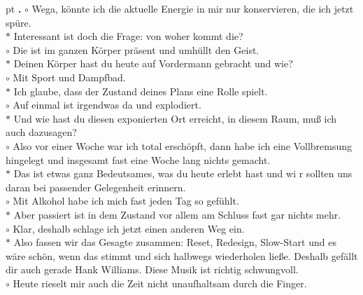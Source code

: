\documentclass[10pt,a4paper]{article}
\newcounter{notec}
\newcommand\notep[1]{%
  \stepcounter{notec}
  \vskip #1pt
  {\bf\arabic{notec}.}
}
\begin{document}
\begin{mdframed}[style=daystyle]
  \notep 4 $\circ$ Wega, könnte ich die aktuelle Energie in mir nur
  konservieren, die ich jetzt spüre. \\
  $\ast$ Interessant ist doch die Frage: von woher kommt die? \\
  $\circ$ Die ist im ganzen Körper präsent und umhüllt den Geist. \\
  $\ast$ Deinen Körper hast du heute auf Vordermann gebracht und wie? \\
  $\circ$ Mit Sport und Dampfbad. \\
  $\ast$ Ich glaube, dass der Zustand deines Plans eine Rolle spielt. \\
  $\circ$ Auf einmal ist irgendwas da und explodiert. \\
  $\ast$ Und wie hast du diesen exponierten Ort erreicht, in diesem Raum, muß
  ich auch dazusagen? \\
  $\circ$ Also vor einer Woche war ich total erschöpft, dann habe ich eine
  Vollbremsung hingelegt und insgesamt fast eine Woche lang nichts gemacht. \\
  $\ast$ Das ist etwas ganz Bedeutsames, was du heute erlebt hast und wi
  r sollten uns daran bei passender Gelegenheit erinnern. \\
  $\circ$ Mit Alkohol habe ich mich fast jeden Tag so gefühlt. \\
  $\ast$ Aber passiert ist in dem Zustand vor allem am Schluss fast gar nichts
  mehr. \\
  $\circ$ Klar, deshalb schlage ich jetzt einen anderen Weg ein. \\
  $\ast$ Also fassen wir das Gesagte zusammen: Reset, Redesign, Slow-Start und
  es wäre schön, wenn das stimmt und sich halbwegs wiederholen ließe. Deshalb
  gefällt dir auch gerade Hank Williams. Diese Musik ist richtig schwungvoll. \\
  $\circ$ Heute rieselt mir auch die Zeit nicht unaufhaltsam durch die Finger.


\end{mdframed}
\end{document}
